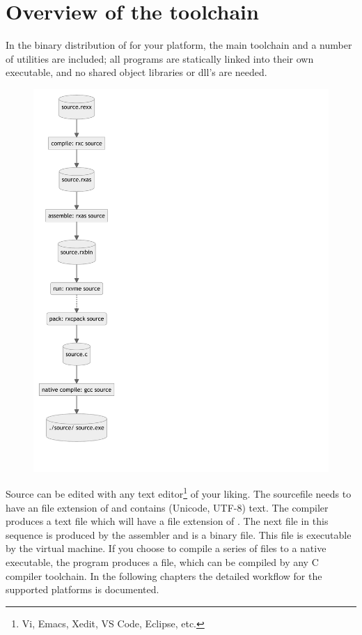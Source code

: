 \chapter{Overview of the toolchain}
In the binary distribution of \crexx{} for your platform, the main
toolchain and a number of utilities are included; all programs are statically linked into
their own executable, and no shared object libraries or dll's are needed.\newline
\begin{figure}
\includegraphics[scale=0.6]{charts/buildflow.pdf}
\end{figure}
\fussy
Source can be edited with any text editor\footnote{Vi, Emacs, Xedit,
  VS Code, Eclipse, etc.} of your liking. The sourcefile needs to have an
file extension of  and contains (Unicode, UTF-8) text. The  \crexx{} compiler
produces a text file which will have a file extension of
. The next file in this sequence is produced by the
 assembler and is a binary  file. This file is
executable by the \crexx{}  virtual machine.\newline\newline
\fussy
If you choose to compile a series of  files to a native
executable, the  program produces a  file,
which can be compiled by any C compiler toolchain.\newline\newline
\fussy
In the following chapters the detailed workflow for the supported platforms is documented.\newline

